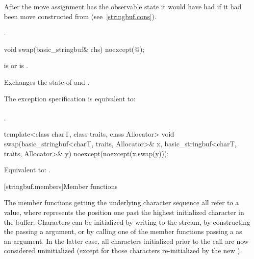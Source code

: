 \begin{itemdescr}
\pnum
\effects
After the move assignment  has the observable state it would
have had if it had been move constructed from  (see~\ref{stringbuf.cons}).

\pnum
\returns
{}.
\end{itemdescr}

%
\begin{itemdecl}
void swap(basic_stringbuf& rhs) noexcept(@\seebelow@);
\end{itemdecl}

\begin{itemdescr}
\pnum
\expects
{}
is  or
 is .

\pnum
\effects
Exchanges the state of 
and .

\pnum
\remarks
The exception specification is equivalent to:\\
\\
.
\end{itemdescr}

%
\begin{itemdecl}
template<class charT, class traits, class Allocator>
  void swap(basic_stringbuf<charT, traits, Allocator>& x,
            basic_stringbuf<charT, traits, Allocator>& y) noexcept(noexcept(x.swap(y)));
\end{itemdecl}

\begin{itemdescr}
\pnum
\effects
Equivalent to: .
\end{itemdescr}

[stringbuf.members]{Member functions}

\pnum
The member functions getting the underlying character sequence
all refer to a  value,
where  represents the position
one past the highest initialized character in the buffer.
Characters can be initialized by writing to the stream,
by constructing the 
passing a  argument, or
by calling one of the  member functions
passing a  as an argument.
In the latter case, all characters initialized prior to the call
are now considered uninitialized
(except for those characters re-initialized by the new ).

